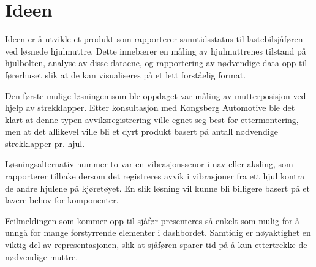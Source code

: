 \section{Ideen}
Ideen er å utvikle et produkt som rapporterer sanntidsstatus til lastebilsjåføren 
ved løsnede hjulmuttre. Dette innebærer en måling av hjulmuttrenes tilstand på 
hjulbolten, analyse av disse dataene, og rapportering av nødvendige data 
opp til førerhuset slik at de kan visualiseres på et lett forståelig format.

Den første mulige løsningen som ble oppdaget var måling av mutterposisjon ved 
hjelp av strekklapper. Etter konsultasjon med Kongsberg Automotive ble det klart 
at denne typen avviksregistrering ville egnet seg best for ettermontering, 
men at det allikevel ville bli et dyrt produkt basert på antall nødvendige 
strekklapper pr. hjul. 

Løsningsalternativ nummer to var en vibrasjonssenor i nav eller aksling, som 
rapporterer tilbake dersom det registreres avvik i vibrasjoner fra ett hjul 
kontra de andre hjulene på kjøretøyet. En slik løsning vil kunne bli billigere 
basert på et lavere behov for komponenter.

Feilmeldingen som kommer opp til sjåfør presenteres så enkelt som mulig for å unngå for mange forstyrrende elementer i dashbordet. Samtidig er nøyaktighet en viktig del av representasjonen, slik at sjåføren sparer tid på å kun ettertrekke de nødvendige muttre.

